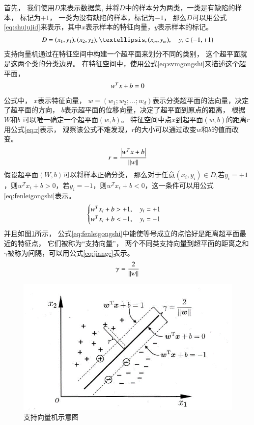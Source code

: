 首先，
我们使用$D$来表示数据集,
并将$D$中的样本分为两类，一类是有缺陷的样本，
标记为$+1$，
一类为没有缺陷的样本，标记为$-1$，
那么$D$可以用公式\eqref{eq:shujujid}来表示，其中$x$表示样本的特征向量，$y$表示样本的标记。
\begin{equation}
\centering
D={(x_1,y_1), 
(x_2,y_2),…,(x_m,y_m)},\quad y_i\in \{-1,+1\}
\label{eq:shujujid}
\end{equation}
支持向量机通过在特征空间中构建一个超平面来划分不同的类别，
这个超平面就是这两个类的分类边界。
在特征空间中，使用公式\eqref{eq:svmgongshi}来描述这个超平面，
\begin{equation}
\centering
w^Tx+b=0
\label{eq:svmgongshi}
\end{equation}
公式中，
$x$表示特征向量，
$w=(w_1;w_2;…;w_d)$表示分类超平面的法向量，决定了超平面的方向，
$b$表示超平面的位移向量，决定了超平面到原点的距离，
根据$W$和$b$
可以唯一确定一个超平面$(w,b)$。
特征空间中点$x$到超平面$(w,b)$的距离$r$用公式\eqref{eq:r}表示，
观察该公式不难发现，$r$的大小可以通过改变$w$和$b$的值而改变。
\begin{equation}
\centering
r=\frac{\left| w^Tx+b\right|}{\lVert w\rVert}
\label{eq:r}
\end{equation}
假设超平面$(W,b)$可以将样本正确分类，
那么对于任意$(x_i,y_i)\in D$,若$y_i=+1$，则$w^T x_i+b>0$，若$y_i=-1$，则$w^T x_i+b<0$，这一条件可以用公式\eqref{eq:fenleigongshi}表示。
\begin{equation}
\centering
\begin{cases}
w^Tx_i+b>+1 ,\quad y_i=+1\\
w^Tx_i+b<-1 ,\quad y_i=-1
\end{cases}
\label{eq:fenleigongshi}
\end{equation}
并且如图\ref{fig:svm}所示，
公式\eqref{eq:fenleigongshi}中能使等号成立的点恰好是距离超平面最近的特征点，
它们被称为“支持向量”，
两个不同类支持向量到超平面的距离之和$\gamma$被称为间隔，可以用公式\eqref{eq:jiange}表示。
\begin{equation}
\centering
\gamma = \frac{2}{ \lVert w\rVert }
\label{eq:jiange}
\end{equation}
\begin{figure}[htbp]
\centering
\includegraphics[width=1.0\linewidth]{figures/svm.png}
\caption{支持向量机示意图}
\label{fig:svm}
\end{figure}
